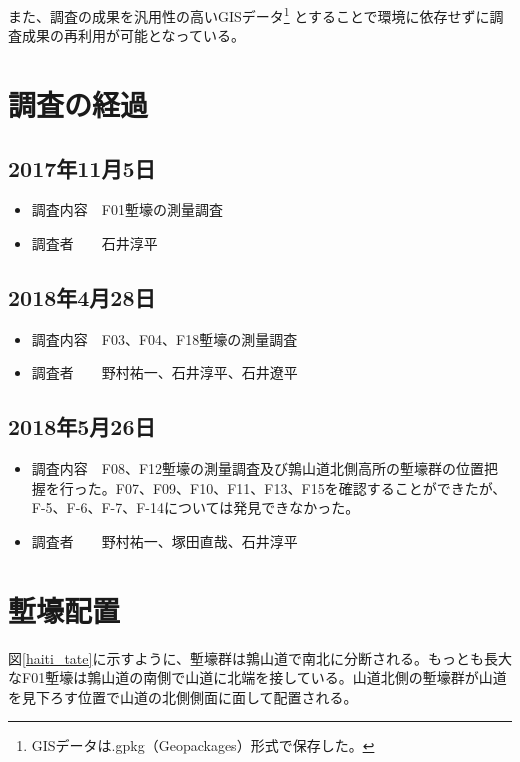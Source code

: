 \documentclass[14Q]{jsarticle}
\begin{document}
また、調査の成果を汎用性の高いGISデータ\footnote{
GISデータは.gpkg（Geopackages）形式で保存した。
}
とすることで環境に依存せずに調査成果の再利用が可能となっている。

\section{調査の経過}
\subsection{2017年11月5日}
\begin{itemize}
\item 調査内容　F01塹壕の測量調査
\item 調査者　　石井淳平
\end{itemize}

\subsection{2018年4月28日}
\begin{itemize}
\item 調査内容　F03、F04、F18塹壕の測量調査
\item 調査者　　野村祐一、石井淳平、石井遼平
\end{itemize}

\subsection{2018年5月26日}
\begin{itemize}
\item 調査内容　F08、F12塹壕の測量調査及び鶉山道北側高所の塹壕群の位置把握を行った。F07、F09、F10、F11、F13、F15を確認することができたが、F-5、F-6、F-7、F-14については発見できなかった。
\item 調査者　　野村祐一、塚田直哉、石井淳平
\end{itemize}

\section{塹壕配置}
図\ref{haiti_tate}に示すように、塹壕群は鶉山道で南北に分断される。もっとも長大なF01塹壕は鶉山道の南側で山道に北端を接している。山道北側の塹壕群が山道を見下ろす位置で山道の北側側面に面して配置される。
\end{document}
